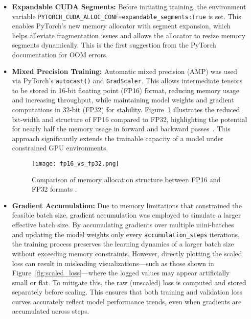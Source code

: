 \begin{itemize}
    \item \textbf{Expandable CUDA Segments:} Before initiating training, the environment variable \texttt{PYTORCH\_CUDA\_ALLOC\_CONF=expandable\_segments:True} is set. This enables PyTorch’s new memory allocator with segment expansion, which helps alleviate fragmentation issues and allows the allocator to resize memory segments dynamically. This is the first suggestion from the PyTorch documentation for OOM errors.

    \item \textbf{Mixed Precision Training:} Automatic mixed precision (AMP) was used via PyTorch’s \texttt{autocast()} and \texttt{GradScaler}. This allows intermediate tensors to be stored in 16-bit floating point (FP16) format, reducing memory usage and increasing throughput, while maintaining model weights and gradient computations in 32-bit (FP32) for stability. Figure~\ref{fig:fp16_vs_fp32} illustrates the reduced bit-width and structure of FP16 compared to FP32, highlighting the potential for nearly half the memory usage in forward and backward passes~\cite{mindspore_mixed_precision}. This approach significantly extends the trainable capacity of a model under constrained GPU environments.

    \begin{figure}[H]
        \centering
        \texttt{[image: fp16\_vs\_fp32.png]}
        \caption{Comparison of memory allocation structure between FP16 and FP32 formats \cite{mindspore_mixed_precision}.}
        \label{fig:fp16_vs_fp32}
    \end{figure}

    \item \textbf{Gradient Accumulation:} Due to memory limitations that constrained the feasible batch size, gradient accumulation was employed to simulate a larger effective batch size. By accumulating gradients over multiple mini-batches and updating the model weights only every \texttt{accumulation\_steps} iterations, the training process preserves the learning dynamics of a larger batch size without exceeding memory constraints. However, directly plotting the scaled loss can result in misleading visualizations—such as those shown in Figure~\ref{fig:scaled_loss}—where the logged values may appear artificially small or flat. To mitigate this, the raw (unscaled) loss is computed and stored separately before scaling. This ensures that both training and validation loss curves accurately reflect model performance trends, even when gradients are accumulated across steps.


\end{itemize}
